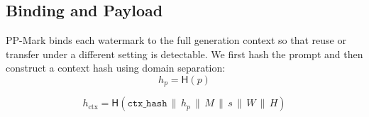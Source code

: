 \documentclass{article}
\theoremstyle{plain}
\theoremstyle{definition}
\theoremstyle{remark}
\begin{document}


\subsection{Binding and Payload}\label{sec:binding-payload}
PP-Mark binds each watermark to the full generation context so that reuse or transfer under a different setting is detectable. We first hash the prompt and then construct a context hash using domain separation:
\begin{equation}
h_p = \mathsf{H}(p)
\end{equation}

\begin{equation}
h_{\mathrm{ctx}} = \mathsf{H}(\texttt{ctx\_hash} \,\|\, h_p \,\|\, M \,\|\, s \,\|\, W \,\|\, H)
\end{equation}
\end{document}
